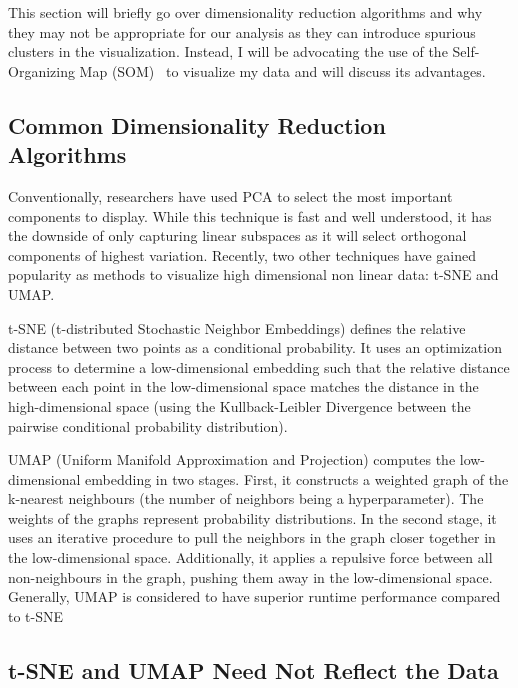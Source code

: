 This section will briefly go over dimensionality reduction algorithms and why they may not be appropriate for our analysis as they can introduce spurious clusters in the visualization. Instead, I will be advocating the use of the Self-Organizing Map (SOM)~\cite{kohonen1990self}  to visualize my data and will discuss its advantages.


\subsection*{Common Dimensionality Reduction Algorithms}

Conventionally, researchers have used PCA to select the most important components to display. While this technique is fast and well understood, it has the downside of only capturing linear subspaces as it will select orthogonal components of highest variation. Recently, two other techniques have gained popularity as methods to visualize high dimensional non linear data: t-SNE and UMAP.  


t-SNE (t-distributed Stochastic Neighbor Embeddings) defines the relative distance between two points as a conditional probability. It uses an optimization process to determine a low-dimensional embedding such that the relative distance between each point in the low-dimensional space matches the distance in the high-dimensional space (using the Kullback-Leibler Divergence between the pairwise conditional probability distribution).

UMAP (Uniform Manifold Approximation and Projection) computes the low-dimensional embedding in two stages. First, it constructs a weighted graph of the k-nearest neighbours (the number of neighbors being a hyperparameter). The weights of the graphs represent probability distributions. In the second stage, it uses an iterative procedure to pull the neighbors in the graph closer together in the low-dimensional space. Additionally, it applies a repulsive force between all non-neighbours in the graph, pushing them away in the low-dimensional space. Generally, UMAP is considered to have superior runtime performance compared to t-SNE~\cite{mcinnes2020umap}

\subsection*{t-SNE and UMAP Need Not Reflect the Data}

